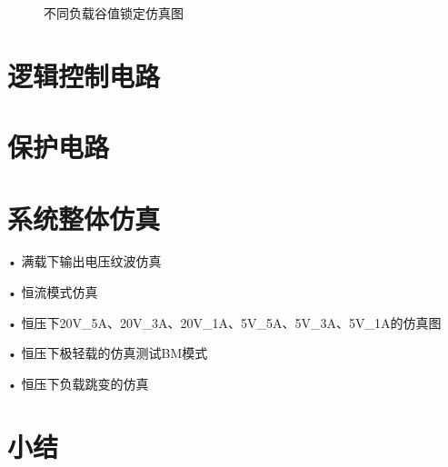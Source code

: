 \begin{figure}[htbp]
	\centering
	\caption{不同负载谷值锁定仿真图}
	\label{fig:谷值锁定放大仿真图}
\end{figure}



\section{逻辑控制电路}

\section{保护电路}

\section{系统整体仿真}

• 满载下输出电压纹波仿真

• 恒流模式仿真

• 恒压下20V\_5A、20V\_3A、20V\_1A、5V\_5A、5V\_3A、5V\_1A的仿真图

• 恒压下极轻载的仿真测试BM模式

• 恒压下负载跳变的仿真



\section{小结}




